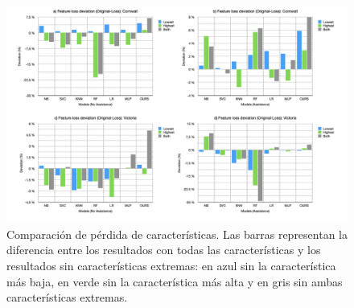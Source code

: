 \begin{figure}[H]
	\centering
	\includegraphics[width=180mm]{Figures/LossFeatures/loss.png}
	\caption{Comparación de pérdida de características. Las barras representan la diferencia entre los resultados con todas las características y los resultados sin características extremas: en azul sin la característica más baja, en verde sin la característica más alta y en gris sin ambas características extremas.}
	\label{lossFig}
\end{figure}

